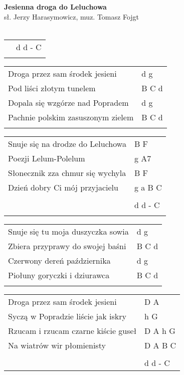 \documentclass[a5paper]{article}
\begin{document}


\noindent
\fontsize{12pt}{15pt}\selectfont
\textbf{Jesienna droga do Leluchowa} \\
\fontsize{8pt}{10pt}\selectfont
sł. Jerzy Harasymowicz, muz. Tomasz Fojgt \\ \\
\fontsize{10pt}{12pt}\selectfont
{}
\begin{tabular}{@{}p{8.00cm}p{3cm}@{}}
\noindent
& d d - C \\ \\
\end{tabular}

\noindent
\begin{tabular}{@{}p{8.00cm}p{3cm}@{}}
Droga przez sam środek jesieni & d g \\
Pod liści złotym tunelem & B C d \\
Dopala się wzgórze nad Popradem & d g \\
Pachnie polskim zasuszonym zielem & B C d \\ \\
\end{tabular}

\noindent
\begin{tabular}{@{}p{7.00cm}p{3cm}@{}}
Snuje się na drodze do Leluchowa & B F \\
Poezji Lelum-Polelum & g A7 \\ 
Słonecznik zza chmur się wychyla & B F \\
Dzień dobry Ci mój przyjacielu & g a B C \\ \\
& d d - C \\ \\
\end{tabular}

\noindent
\begin{tabular}{@{}p{8.00cm}p{3cm}@{}} 
Snuje się tu moja duszyczka sowia & d g \\
Zbiera przyprawy do swojej baśni & B C d \\
Czerwony dereń października & d g \\
Piołuny goryczki i dziurawca & B C d \\ \\
\end{tabular}

\noindent
\begin{tabular}{@{}p{7.00cm}p{3cm}@{}}
Droga przez sam środek jesieni & D A \\
Syczą w Popradzie liście jak iskry & h G \\
Rzucam i rzucam czarne kiście guseł & D A h G \\
Na wiatrów wir płomienisty & D A B C \\ \\
& d d - C
\end{tabular}
\end{document}
